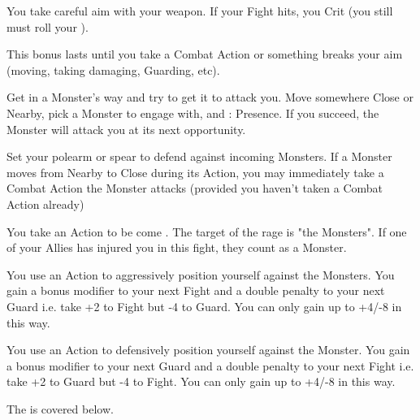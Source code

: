 {  
  
  You take careful aim with your weapon.  If your  Fight \RO hits, you Crit (you still must roll your \FOC).

  This bonus lasts until you take a Combat Action or something breaks your aim (moving, taking damaging, Guarding, etc).


  Get in a Monster's way and try to get it to attack you.  Move somewhere Close or Nearby, pick a Monster to engage with, and \RS : Presence.  If you succeed, the Monster will attack you at its next opportunity.


  Set your polearm or spear to defend against incoming Monsters.  If a Monster moves from Nearby to Close during its Action, you may immediately take a Combat Action  the Monster attacks (provided you haven't taken a Combat Action already)


  You take an Action to be come .  The target of the rage is "the Monsters". If one of your Allies has injured you in this fight, they count as a Monster.


  You use an Action to aggressively position yourself against the Monsters.  You gain a bonus modifier to your next Fight \RO and a double penalty to your next Guard \RO i.e. take +2 to Fight but -4 to Guard.  You can only gain up to +4/-8 in this way.



  You use an Action to defensively position yourself against the Monster.  You gain a bonus modifier to your next Guard \RO and a double penalty to your next Fight \RO i.e. take +2 to Guard but -4 to Fight. You can only gain up to +4/-8 in this way.



  The  is covered below.


}
